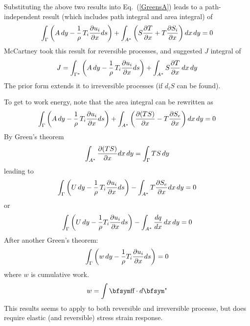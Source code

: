 \documentclass[11pt]{book}
\begin{document}
Substituting the above two results into Eq.~(\ref{GreensA}) leads to a path-independent result (which includes path integral and area integral) of
\begin{equation}%
           \int_\Gamma \left(A\thinspace dy - {1\over\rho}\thinspace T_i {\partial u_i\over \partial x} ds\right)
                        + \int_{A^*}  \left( S {\partial T\over\partial x} + T {\partial S_i\over\partial x} 
                            \right ) dx \thinspace dy = 0
\end{equation}%
McCartney took this result for reversible processes, and suggested $J$ integral of
\begin{equation}%
           J = \int_{\Gamma^*} \left(A\thinspace dy
                     - {1\over\rho}\thinspace T_i {\partial u_i\over \partial x} ds\right)
                        + \int_{A^*}  S {\partial T\over\partial x}\thinspace dx \thinspace dy
\end{equation}%
The prior form extends it to irreversible processes (if $d_iS$ can be found).

To get to work energy, note that the area integral can be rewritten as
\begin{equation}%
           \int_\Gamma \left(A\thinspace dy - {1\over\rho}\thinspace T_i {\partial u_i\over \partial x} ds\right)
                        + \int_{A^*}  \left(  {\partial( TS)\over\partial x} - T {\partial S_e\over\partial x} 
                            \right ) dx \thinspace dy = 0
\end{equation}%
By Green's theorem
\begin{equation}%
         \int_{A^*}    {\partial( TS)\over\partial x}  dx \thinspace dy = \int_\Gamma TS\thinspace dy
\end{equation}%
leading to
\begin{equation}%
           \int_\Gamma \left(U\thinspace dy - {1\over\rho}\thinspace T_i {\partial u_i\over \partial x} ds\right)
                        - \int_{A^*}  T {\partial S_e\over\partial x}  dx \thinspace dy = 0
\end{equation}%
or
\begin{equation}%
           \int_\Gamma \left( U\thinspace dy -  {1\over\rho} T_i {\partial u_i\over \partial x} ds\right)
                        - \int_{A^*}  {dq\over dx} \thinspace  dx \thinspace dy = 0
\end{equation}%
After another Green's theorem:
\begin{equation}%
           \int_\Gamma \left( w\thinspace dy -  {1\over\rho} T_i {\partial u_i\over \partial x} ds\right)
                         = 0
\end{equation}%
where $w$ is cumulative work.
\begin{equation}%
     w = \int \st \cdot d\et
 \end{equation}%
This results seems to apply to both reversible and irreversible processe, but does require elastic (and reversible) stress strain response.
\end{document}
